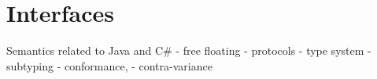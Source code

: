 \section{Interfaces} %
Semantics related to Java and C\#
-	free floating
-	protocols
-	type system 
-	subtyping
-	conformance, 
-	contra-variance
